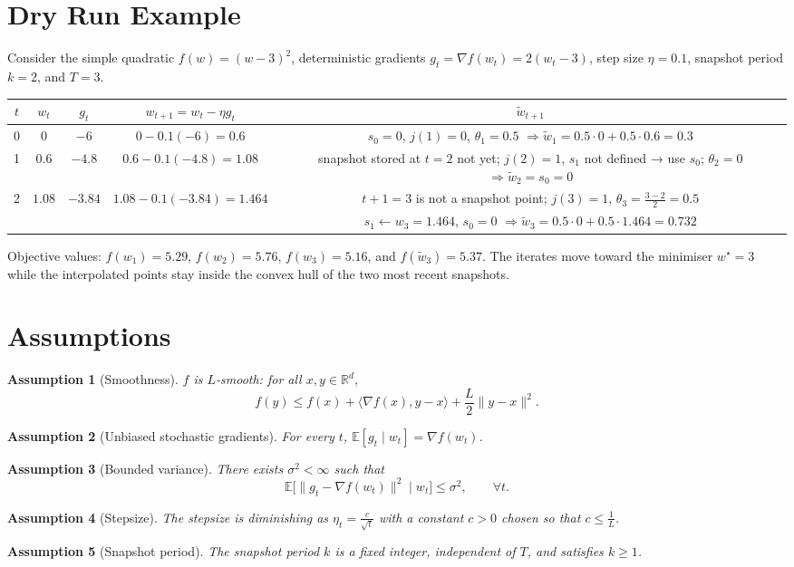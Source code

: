 \documentclass{article}
\newtheorem{assumption}{Assumption}
\newcommand{\E}{\mathbb{E}}
\newcommand{\R}{\mathbb{R}}
\begin{document}
\section*{Dry Run Example}
Consider the simple quadratic $f(w)=(w-3)^2$, deterministic gradients $g_t=\nabla f(w_t)=2(w_t-3)$, step size $\eta=0.1$, snapshot period $k=2$, and $T=3$.

\begin{center}
\begin{tabular}{c|c|c|c|c}
$t$ & $w_t$ & $g_t$ & $w_{t+1}=w_t-\eta g_t$ & $\tilde w_{t+1}$\\\hline
0 & $0$ & $-6$ & $0-0.1(-6)=0.6$ & $s_0=0$, $j(1)=0$, $\theta_1=0.5$ $\Rightarrow\tilde w_1=0.5\cdot0+0.5\cdot0.6=0.3$\\
1 & $0.6$ & $-4.8$ & $0.6-0.1(-4.8)=1.08$ & snapshot stored at $t=2$ not yet; $j(2)=1$, $s_1$ not defined → use $s_0$; $\theta_2=0$ $\Rightarrow\tilde w_2=s_0=0$\\
2 & $1.08$ & $-3.84$ & $1.08-0.1(-3.84)=1.464$ & $t+1=3$ is not a snapshot point; $j(3)=1$, $\theta_3=\frac{3-2}{2}=0.5$\\
   &   &   &   & $s_1\gets w_3=1.464$, $s_0=0$ $\Rightarrow\tilde w_3=0.5\cdot0+0.5\cdot1.464=0.732$\\
\end{tabular}
\end{center}
Objective values: $f(w_1)=5.29$, $f(w_2)=5.76$, $f(w_3)=5.16$, and $f(\tilde w_3)=5.37$. The iterates move toward the minimiser $w^\star=3$ while the interpolated points stay inside the convex hull of the two most recent snapshots.

\newpage
\section*{Assumptions}
\begin{assumption}[Smoothness]\label{as:smooth}
$f$ is $L$‑smooth: for all $x,y\in\R^d$,
\[
    f(y)\le f(x)+\langle\nabla f(x),y-x\rangle+\frac{L}{2}\|y-x\|^2 .
\]
\end{assumption}
\begin{assumption}[Unbiased stochastic gradients]\label{as:unbiased}
For every $t$, $\E[g_t\mid w_t]=\nabla f(w_t)$.
\end{assumption}
\begin{assumption}[Bounded variance]\label{as:variance}
There exists $\sigma^2<\infty$ such that
\[
    \E\big[\|g_t-\nabla f(w_t)\|^2\mid w_t\big]\le\sigma^2,\qquad\forall t .
\]
\end{assumption}
\begin{assumption}[Stepsize]\label{as:stepsize}
The stepsize is diminishing as $\eta_t=\frac{c}{\sqrt{t}}$ with a constant $c>0$ chosen so that $c\le\frac{1}{L}$.
\end{assumption}
\begin{assumption}[Snapshot period]\label{as:snap}
The snapshot period $k$ is a fixed integer, independent of $T$, and satisfies $k\ge1$.
\end{assumption}
\end{document}
